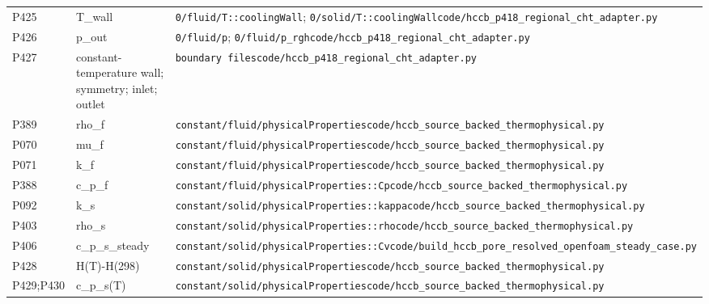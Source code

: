\begin{longtable}{>{\raggedright\arraybackslash}p{2.0cm}>{\raggedright\arraybackslash}p{4.0cm}>{\raggedright\arraybackslash}p{12.2cm}}
P425 & T\_\allowbreak{}wall & \nolinkurl{0/fluid/T::coolingWall}; \nolinkurl{0/solid/T::coolingWall}\newline \nolinkurl{code/hccb_p418_regional_cht_adapter.py} \\
P426 & p\_\allowbreak{}out & \nolinkurl{0/fluid/p}; \nolinkurl{0/fluid/p_rgh}\newline \nolinkurl{code/hccb_p418_regional_cht_adapter.py} \\
P427 & constant-temperature wall;\allowbreak{} symmetry;\allowbreak{} inlet;\allowbreak{} outlet & \nolinkurl{boundary files}\newline \nolinkurl{code/hccb_p418_regional_cht_adapter.py} \\
P389 & rho\_\allowbreak{}f & \nolinkurl{constant/fluid/physicalProperties}\newline \nolinkurl{code/hccb_source_backed_thermophysical.py} \\
P070 & mu\_\allowbreak{}f & \nolinkurl{constant/fluid/physicalProperties}\newline \nolinkurl{code/hccb_source_backed_thermophysical.py} \\
P071 & k\_\allowbreak{}f & \nolinkurl{constant/fluid/physicalProperties}\newline \nolinkurl{code/hccb_source_backed_thermophysical.py} \\
P388 & c\_\allowbreak{}p\_\allowbreak{}f & \nolinkurl{constant/fluid/physicalProperties::Cp}\newline \nolinkurl{code/hccb_source_backed_thermophysical.py} \\
P092 & k\_\allowbreak{}s & \nolinkurl{constant/solid/physicalProperties::kappa}\newline \nolinkurl{code/hccb_source_backed_thermophysical.py} \\
P403 & rho\_\allowbreak{}s & \nolinkurl{constant/solid/physicalProperties::rho}\newline \nolinkurl{code/hccb_source_backed_thermophysical.py} \\
P406 & c\_\allowbreak{}p\_\allowbreak{}s\_\allowbreak{}steady & \nolinkurl{constant/solid/physicalProperties::Cv}\newline \nolinkurl{code/build_hccb_pore_resolved_openfoam_steady_case.py} \\
P428 & H(\allowbreak{}T)-H(\allowbreak{}298) & \nolinkurl{constant/solid/physicalProperties}\newline \nolinkurl{code/hccb_source_backed_thermophysical.py} \\
P429;\allowbreak{}P430 & c\_\allowbreak{}p\_\allowbreak{}s(\allowbreak{}T) & \nolinkurl{constant/solid/physicalProperties}\newline \nolinkurl{code/hccb_source_backed_thermophysical.py} \\

\end{longtable}
